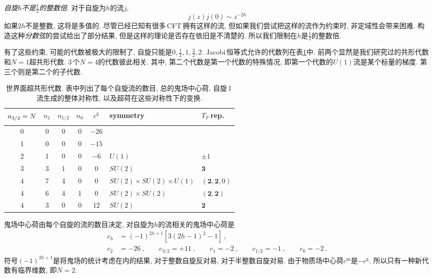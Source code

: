 {\emph{自旋$ h $不是$ \frac{1}{2} $的整数倍}}. 对于自旋为$ h $的流$ j$,
\begin{equation}
    j(z)j(0)\sim z^{-2h} \label{11.1.1}
\end{equation}
如果$ 2h $不是整数, 这将是多值的. 尽管已经已知有很多\,CFT\,拥有这样的流, 但如果我们尝试把这样的流作为约束时, 非定域性会带来困难. 构造这种{\emph{分数弦}}的尝试给出了部分结果, 但是这样的理论是否存在依旧是不清楚的. 所以我们限制在$ h $是$ \frac{1}{2} $的整数倍.

有了这些约束, 可能的代数被极大的限制了, 自旋只能是$ 0,\frac{1}{2},1,\frac{3}{2},2$. Jacobi\,恒等式允许的代数列在表\ref{tab:11.1}中. 前两个显然是我们研究过的共形代数和$ N=1 $超共形代数. 3\,个$ N=4 $的代数彼此相关. 其中, 第二个代数是第一个代数的特殊情况, 即第一个代数的$ U(1) $流是某个标量的梯度. 第三个则是第二个的子代数.

\begin{table}[ht]
\caption{世界面超共形代数. 表中列出了每个自旋流的数目, 总的鬼场中心荷, 自旋\,1\,流生成的整体对称性, 以及超荷在这些对称性下的变换.}
\label{tab:11.1}%
\centering
\begin{tabular}[c]{cccccll}
\hline\hline
 $\vphantom{\Big[}n_{3/2}=N$ & $n_{1}$ & $n_{1/2}$ & $n_{0}$ & $c^{\text{g}}$ & symmetry & $T_{F}\:$rep. \\
\hline
 0 & 0 & 0 & 0 & $-26$ & &  \\
 1 & 0 & 0 & 0 & $-15$ & &  \\
 2 & 1 & 0 & 0 & $-6$ & $U(1)$ & $\pm1$  \\
 3 & 3 & 1 & 0 & 0 & $SU(2)$ & $\mathbf{3}$  \\
 4 & 7 & 4 & 0 & 0 & $SU(2)\times SU(2)\times U(1)$ & $(\mathbf{2},\mathbf{2},0)$  \\
 4 & 6 & 4 & 1 & 0 & $SU(2)\times SU(2)$ & $(\mathbf{2},\mathbf{2})$  \\
 4 & 3 & 0 & 0 & 12 & $SU(2)$ & $\mathbf{2}$  \\
 \hline\hline
\end{tabular}
\end{table}

鬼场中心荷由每个自旋的流的数目决定, 对自旋为$ h $的流相关的鬼场中心荷是
\begin{subequations}
    \begin{align}
        c_{h}&=(-1)^{2h+1}[3(2h-1)^{2}-1] \: , \label{11.1.2a} \\
        c_{2}&=-26\:,\qquad c_{3/2}=+11\:,\qquad c_{1}=-2\:,\qquad c_{1/2}=-1\:, \qquad c_{0}=-2\:. \label{11.1.2b}
    \end{align} \label{11.1.2}
\end{subequations}
符号$ (-1)^{2h+1} $是将鬼场的统计考虑在内的结果, 对于整数自旋反对易, 对于半整数自旋对易. 由于物质场中心荷$ c^{\text{m}} $是$ -c^{\text{g}}$, 所以只有一种新代数有临界维数, 即$ N=2$.

